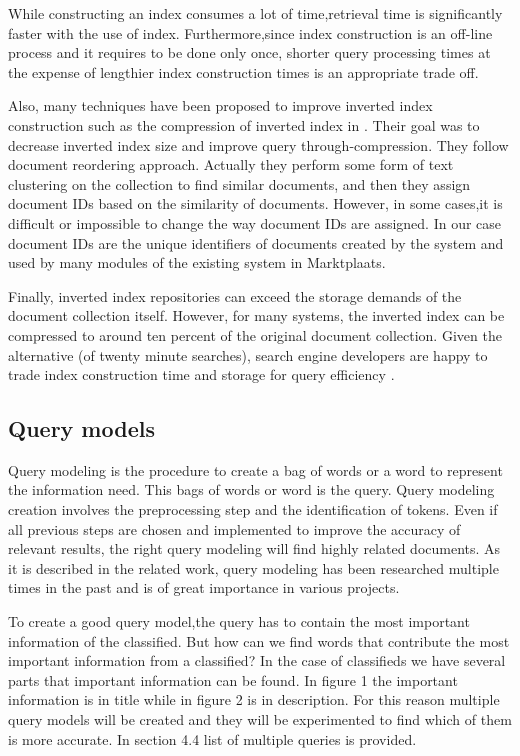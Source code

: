 \documentclass{article}
\begin{document}
While constructing an index consumes a lot of time,retrieval time is significantly faster with the use of index. Furthermore,since index construction is an off-line process and it requires to be done only once, shorter query processing times at the expense of lengthier index construction times is an appropriate trade off.

Also, many techniques have been proposed to improve inverted index construction such as the compression of inverted index in \cite{HaoShuai}. Their goal was to decrease inverted index size and improve query through-compression. They follow document reordering approach. Actually they perform some form of text clustering on the collection to find similar documents, and then they assign document IDs based on the similarity of documents. However, in some cases,it is difficult or impossible to change the way document IDs are assigned. In our case document IDs are the unique identifiers of documents created by the system and used by many modules of the existing system in Marktplaats.

Finally, inverted index repositories can exceed the storage demands of the document collection itself. However, for many systems, the inverted index can be compressed to around ten percent of the original document collection. Given the alternative (of twenty minute searches), search engine developers are happy to trade index construction time and storage for query efficiency \cite{IrBook}.


\subsection{Query models}

Query modeling is the procedure to create a bag of words or a word to represent the information need. This bags of words or word is the query. Query modeling creation involves the preprocessing step and the identification of tokens. Even if all previous steps are chosen and implemented to improve the accuracy of relevant results, the right query modeling will find highly related documents. As it is described in the related work, query modeling has been researched multiple times in the past and is of great importance in various projects.

To create a good query model,the query has to contain the most important information of the classified. But how can we find words that contribute the most important information from a classified? In the case of classifieds we have several parts that important information can be found. In figure 1 the important information is in title while in figure 2 is in description. For this reason multiple query models will be created and they will be experimented to find which of them is more accurate. In section 4.4 list of multiple queries is provided.
\end{document}
